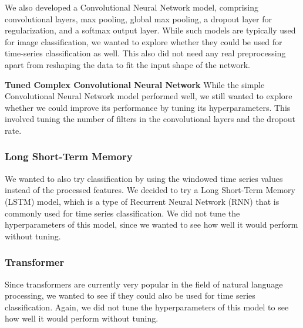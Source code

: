 We also developed a Convolutional Neural Network model, comprising convolutional layers, max pooling, global max pooling, a dropout layer for regularization, and a softmax output layer.
While such models are typically used for image classification, we wanted to explore whether they could be used for time-series classification as well.
This also did not need any real preprocessing apart from reshaping the data to fit the input shape of the network.

\textbf{Tuned Complex Convolutional Neural Network}
While the simple Convolutional Neural Network model performed well, we still wanted to explore whether we could improve its performance by tuning its hyperparameters.
This involved tuning the number of filters in the convolutional layers and the dropout rate.

\subsubsection{Long Short-Term Memory}

We wanted to also try classification by using the windowed time series values instead of the processed features.
We decided to try a Long Short-Term Memory (LSTM) model, which is a type of Recurrent Neural Network (RNN) that is commonly used for time series classification.
We did not tune the hyperparameters of this model, since we wanted to see how well it would perform without tuning.

\subsubsection{Transformer}

Since transformers are currently very popular in the field of natural language processing, we wanted to see if they could also be used for time series classification.
Again, we did not tune the hyperparameters of this model to see how well it would perform without tuning.

